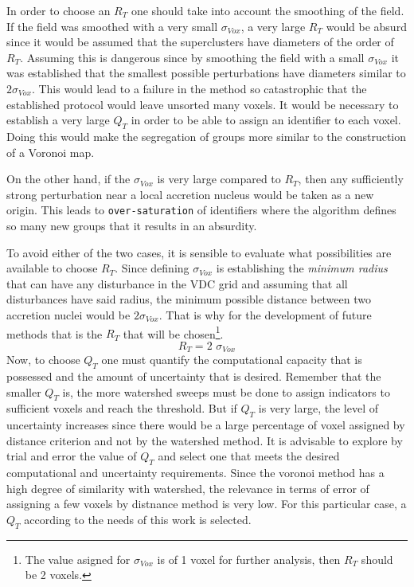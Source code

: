 \documentclass[a4paper,fleqn,usenatbib]{mnras}
\begin{document}
In order to choose an $R_T$ one should take into account the smoothing of the field. If the field was smoothed with a very small $\sigma_{Vox}$, a very large $R_T$ would be absurd since it would be assumed that the superclusters have diameters of the order of $R_T$. Assuming this is dangerous since by smoothing the field with a small $\sigma_{Vox}$ it was established that the smallest possible perturbations have diameters similar to $2 \sigma_{Vox}$. This would lead to a failure in the method so catastrophic that the established protocol would leave unsorted many voxels. It would be necessary to establish a very large $Q_T$ in order to be able to assign an identifier to each voxel. Doing this would make the segregation of groups more similar to the construction of a Voronoi map.

On the other hand, if the $\sigma_{Vox}$ is very large compared to $R_T$, then any sufficiently strong perturbation near a local accretion nucleus would be taken as a new origin. This leads to \texttt{over-saturation} of identifiers where the algorithm defines so many new groups that it results in an absurdity.

To avoid either of the two cases, it is sensible to evaluate what possibilities are available to choose $R_T$. Since defining $\sigma_{Vox}$  is establishing the \textit{minimum radius} that can have any disturbance in the VDC grid and assuming that all disturbances have said radius, the minimum possible distance between two accretion nuclei would be $2 \sigma_{Vox}$. That is why for the development of future methods that is the $R_T$ that will be chosen\footnote{ The  value asigned for $ \sigma_{Vox}$ is of 1 voxel for further analysis, then $R_T$ should be 2 voxels.}.
\begin{equation}
    R_T = \text{2 } \sigma_{Vox}
\end{equation}
Now, to choose $Q_T$ one must quantify the computational capacity that is possessed and the amount of uncertainty that is desired. Remember that the smaller $Q_T$ is, the more watershed sweeps must be done to assign indicators to sufficient voxels and reach the threshold. But if $Q_T$ is very large, the level of uncertainty increases since there would be a large percentage of voxel assigned by distance criterion and not by the watershed method. It is advisable to explore by trial and error the value of $Q_T$ and select one that meets the desired computational and uncertainty requirements. Since the voronoi method has a high degree of similarity with watershed, the relevance in terms of error of assigning a few voxels by distnance method is very low. For this particular case, a $Q_T$ according to the needs of this work is selected.
\end{document}

